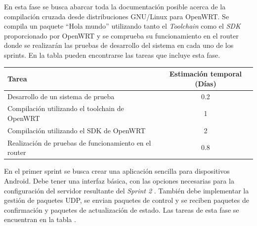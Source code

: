 \documentclass[12pt]{article}
\begin{document}
            En esta fase se busca abarcar toda la documentación posible acerca de la compilación cruzada desde distribuciones GNU/Linux para OpenWRT. Se compila un paquete ``Hola mundo'' utilizando tanto el \textit{Toolchain} como el \textit{SDK} proporcionado por OpenWRT y se comprueba su funcionamiento en el router donde se realizarán las pruebas de desarrollo del sistema en cada uno de los sprints. En la tabla  pueden encontrarse las tareas que incluye esta fase.

            \begin{tabular}{|l|c|}
                \hline
                \textbf{Tarea}                                                              &   \textbf{Estimación temporal} (Días) \\           
                \hline
                Desarrollo de un sistema de prueba                                          &   0.2                                 \\
                Compilación utilizando el toolchain de OpenWRT                              &   1                                   \\
                Compilación utilizando el SDK de OpenWRT                                    &   2                                   \\
                Realización de pruebas de funcionamiento en el router                       &   0.8                                 \\
                \hline
            \end{tabular}

            En el primer sprint se busca crear una aplicación sencilla para dispositivos Android. Debe tener una interfaz básica, con las opciones necesarias para la configuración del servidor resultante del \textit{Sprint 2} . También debe implementar la gestión de paquetes UDP, se envian paquetes de control y se reciben paquetes de confirmación y paquetes de actualización de estado. Las tareas de esta fase se encuentran en la tabla .
\end{document}

